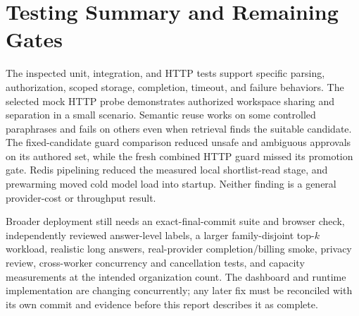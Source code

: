 \section{Testing Summary and Remaining Gates}
The inspected unit, integration, and HTTP tests support specific parsing, authorization, scoped storage, completion, timeout, and failure behaviors. The selected mock HTTP probe demonstrates authorized workspace sharing and separation in a small scenario. Semantic reuse works on some controlled paraphrases and fails on others even when retrieval finds the suitable candidate. The fixed-candidate guard comparison reduced unsafe and ambiguous approvals on its authored set, while the fresh combined HTTP guard missed its promotion gate. Redis pipelining reduced the measured local shortlist-read stage, and prewarming moved cold model load into startup. Neither finding is a general provider-cost or throughput result.

Broader deployment still needs an exact-final-commit suite and browser check, independently reviewed answer-level labels, a larger family-disjoint top-$k$ workload, realistic long answers, real-provider completion/billing smoke, privacy review, cross-worker concurrency and cancellation tests, and capacity measurements at the intended organization count. The dashboard and runtime implementation are changing concurrently; any later fix must be reconciled with its own commit and evidence before this report describes it as complete.
